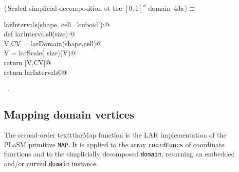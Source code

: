 \documentclass[11pt,oneside]{article}    %
\begin{document}
\begin{flushleft} \small \label{scrap70}
\protect{}$\langle\,$Scaled simplicial decomposition ot the $[0,1]^d$ domain\nobreak\ {\footnotesize 43a}$\,\rangle\equiv$
\vspace{-1ex}
\begin{list}{}{} \item
\mbox{}\verb@def larIntervals(shape, cell='cuboid'):@\\
\mbox{}\verb@    def larIntervals0(size):@\\
\mbox{}\verb@        V,CV = larDomain(shape,cell)@\\
\mbox{}\verb@        V = larScale( size)(V)@\\
\mbox{}\verb@        return [V,CV]@\\
\mbox{}\verb@    return larIntervals0@\\
\mbox{}\verb@@{\NWsep}
\end{list}
\vspace{-1ex}
\footnotesize\addtolength{\baselineskip}{-1ex}
\begin{list}{}{\setlength{\itemsep}{-\parsep}\setlength{\itemindent}{-\leftmargin}}
\item \NWtxtMacroRefIn\ .
\end{list}
\end{flushleft}

\subsection{Mapping domain vertices}
The second-order texttt{larMap} function is the LAR implementation of the PLaSM primitive \texttt{MAP}.
It is applied to the array \texttt{coordFuncs} of coordinate functions and to the simplicially decomposed  \texttt{domain}, returning an embedded and/or curved \texttt{domain} instance.
\end{document}
